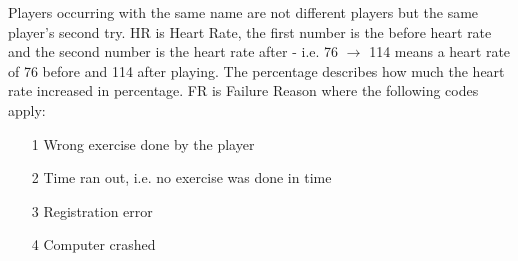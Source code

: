 \documentclass[11pt]{report}
\begin{document}
Players occurring with the same name are not different players but the same player's second try. HR is Heart Rate, the first number is the before heart rate and the second number is the heart rate after - i.e. 76 $\rightarrow$ 114 means a heart rate of 76 before and 114 after playing. The percentage describes how much the heart rate increased in percentage. FR is Failure Reason where the following codes apply:
\begin{itemize}
\item[1] Wrong exercise done by the player
\item[2] Time ran out, i.e. no exercise was done in time
\item[3] Registration error
\item[4] Computer crashed
\end{itemize}
\end{document}
